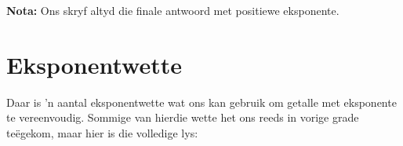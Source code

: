 % 
% 
% 
% 
% 
% 
% 
      
\textbf{Nota:} Ons skryf altyd die finale antwoord met positiewe eksponente.


% 
% 
% 
% 

\par
{}  
    


\section {Eksponentwette}
\nopagebreak

\label{m38359*id63061}Daar is 'n aantal eksponentwette wat ons kan gebruik om getalle met eksponente te vereenvoudig. Sommige
van hierdie wette het ons reeds in vorige grade teëgekom, maar hier is die volledige lys:




